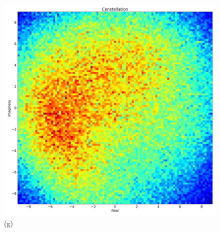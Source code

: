 \begin{landscape}
\begin{figure}[htpb]
\begin{minipage}[h]{0.45\linewidth}
\begin{minipage}[h]{0.49\linewidth}
{            \includegraphics[width=1\linewidth]{images/demo/smf/smf_6.jpg} (g) \\
        }
        \end{minipage}
        \hfill
        \begin{minipage}[h]{0.49\linewidth}
\end{minipage}
\end{minipage}
\end{figure}
\end{landscape}
